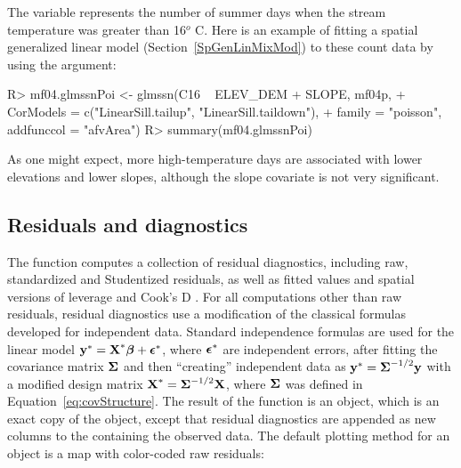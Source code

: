 \documentclass[nojss]{jss}
\renewenvironment{Schunk}{\vspace{\topsep}}{\vspace{\topsep}}
\def\bbeta{\mbox{\boldmath $\beta$}}
\def\bepsilon{\mbox{\boldmath $\epsilon$}}
\def\bSigma{\mbox{\boldmath $\Sigma$}}
\def\by{\textbf{y}}
\def\bX{\textbf{X}}
\begin{document}
The variable  represents the number of summer days when the
stream temperature was greater than 16$^o$ C.  Here is an example of
fitting a spatial generalized linear model
(Section~\ref{SpGenLinMixMod}) to these count data by using the
 argument:

\begin{Schunk}
\begin{Sinput}
R> mf04.glmssnPoi <- glmssn(C16 ~ ELEV_DEM + SLOPE, mf04p,
+    CorModels = c("LinearSill.tailup", "LinearSill.taildown"),
+    family = "poisson", addfunccol = "afvArea")
R> summary(mf04.glmssnPoi)
\end{Sinput}
\end{Schunk}

As one might expect, more high-temperature days are associated with
lower elevations and lower slopes, although the slope covariate is not
very significant.


\subsection{Residuals and diagnostics}

The  function computes a collection of residual
diagnostics, including raw, standardized and Studentized residuals, as
well as fitted values and spatial versions of leverage and Cook's D
\citep{Cook:Weis:resi:1982}. For all computations other than raw
residuals, residual diagnostics use a modification of the classical
formulas developed for independent data. Standard independence
formulas are used for the linear model $\by^* = \bX^*\bbeta +
\bepsilon^*$, where $\bepsilon^*$ are independent errors, after
fitting the covariance matrix $\bSigma$ and then ``creating''
independent data as $\by^*=\bSigma^{-1/2}\by$ with a modified design
matrix $\bX^*=\bSigma^{-1/2}\bX$, where $\bSigma$ was defined in
Equation~\ref{eq:covStructure}. The result of the 
function is an  object, which is an exact copy of
the  object, except that residual diagnostics are
appended as new columns to the  
containing the observed data. The default plotting method for an
 object is a map with color-coded raw residuals:
\end{document}
